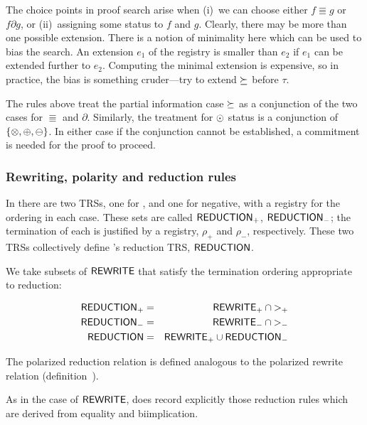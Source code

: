 The choice points in proof search arise when (i)~we can choose either
$f\Equiv g$ or $f\partial g$, or (ii)~assigning some status to $f$ and
$g$.  Clearly, there may be more than one possible extension.  There
is a notion of minimality here which can be used to bias the search.
An extension $e_1$ of the registry is smaller than $e_2$ if $e_1$ can
be extended further to $e_2$.  Computing the minimal extension is
expensive, so in practice, the bias is  something cruder---try
to extend $\succeq$ before $\tau$.

The rules above treat the partial information case $\succeq$ as a
conjunction of the two cases for $\Equiv$ and $\partial$.  Similarly, the
treatment for $\odot$ status is a conjunction of
$\{\otimes,\oplus,\ominus\}$.  In either case if the conjunction cannot
be established, a commitment is needed for the proof to proceed.


\subsubsection {Rewriting, polarity and reduction rules}


In \clam there are two TRSs, one for , and one
for negative, with a registry for the ordering
in each case.  These sets are called ${\sf REDUCTION}_+$, ${\sf REDUCTION}_-$;
the termination of each is justified by a registry, $\rho_+$ and
$\rho_-$, respectively.  These two TRSs collectively define \clam's
reduction TRS, $\Reduction$.

We take subsets of ${\sf REWRITE}$ that satisfy the termination ordering
appropriate to reduction:

\begin{defn}[$\Reduction$]
\begin{eqnarray*}
	{\sf REDUCTION}_+ &=& {{\sf REWRITE}_+} \cap {>_+} \\
	{\sf REDUCTION}_- &=& {{\sf REWRITE}_-} \cap {>_-} \\
	{\sf REDUCTION} &=& {{\sf REWRITE}_+} \cup {{\sf REDUCTION}_-}
\end{eqnarray*}
\end{defn}
The polarized reduction relation is defined analogous to the polarized 
rewrite relation (definition~).

\begin{remark}
As in the case of ${\sf REWRITE}$, \clam does record explicitly those
reduction rules which are derived from equality and biimplication.  
\end{remark}


